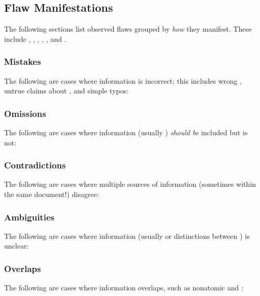     \begin{landscape}
        \flawMnfstsTable{}
        \flawDmnsTable{}
    \end{landscape}

    
     \fi

\subsection{Flaw Manifestations}\label{flawMnfsts}

The following sections list observed flaws grouped by \emph{how} they manifest.
These include \wrong{}, \miss{}, \contra{}, \ambi{}, \over{}, and \redun{}.

\subsubsection{Mistakes}\label{wrong}
The following are cases where information is incorrect; this includes wrong
, untrue claims about \trace{}, and simple typos:



\subsubsection{Omissions}\label{miss}
The following are cases where information (usually ) \emph{should be}
included but is not:



\subsubsection{Contradictions}\label{contra}
The following are cases where multiple sources of information (sometimes within
the same document!) disagree:



\subsubsection{Ambiguities}\label{ambi}
The following are cases where information (usually  or distinctions
between ) is unclear:



\subsubsection{Overlaps}\label{over}
The following are cases where information overlaps, such as nonatomic 
and :


